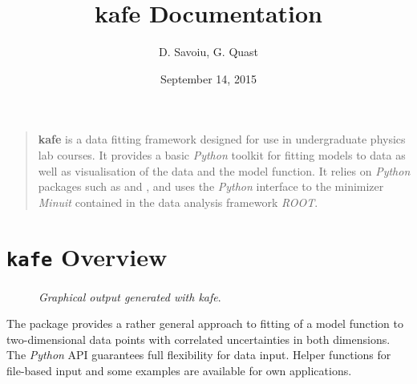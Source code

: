 \documentclass[a4paper,10pt,english]{sphinxmanual}
\title{kafe Documentation}
\date{September 14, 2015}
\author{D. Savoiu, G. Quast}
\begin{document}
\maketitle
\tableofcontents
{}\label{index::doc}

\begin{quote}

\textbf{kafe} is a data fitting framework designed for use in undergraduate
physics lab courses. It provides a basic \emph{Python} toolkit for fitting
models to data as well as visualisation of the data and the model function.
It relies on \emph{Python} packages such as  and ,
and uses the \emph{Python} interface to the minimizer \emph{Minuit} contained in the data
analysis framework \emph{ROOT}.
\end{quote}


\chapter{\texttt{kafe} Overview}
\label{index:welcome-to-kafe-karlsruhe-fit-environment}\label{index:kafe-overview}\begin{figure}[htbp]\begin{flushright}
\capstart

\caption{\emph{Graphical output generated with kafe}.}\end{flushright}\end{figure}

The  package provides a rather general approach to fitting of
a model function to two-dimensional data points with correlated uncertainties
in both dimensions. The \emph{Python} API guarantees full flexibility
for data input. Helper functions for file-based input and some
examples are available for own applications.
\end{document}
